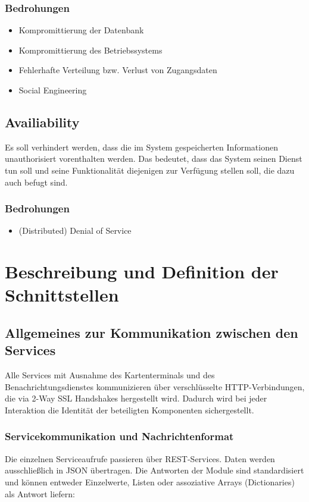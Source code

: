 \documentclass[12pt,a4paper,titlepage,oneside]{scrartcl}
\begin{document}
\subsubsection{Bedrohungen}
\begin{itemize}
	\item Kompromittierung der Datenbank
	\item Kompromittierung des Betriebssystems
	\item Fehlerhafte Verteilung bzw. Verlust von Zugangsdaten
	\item Social Engineering
\end{itemize}

\subsection{Availiability}
Es soll verhindert werden, dass die im System gespeicherten Informationen
unauthorisiert vorenthalten werden. Das bedeutet, dass das System seinen Dienst
tun soll und seine Funktionalität diejenigen zur Verfügung stellen soll, die dazu
auch befugt sind.

\subsubsection{Bedrohungen}
\begin{itemize}
	\item (Distributed) Denial of Service
\end{itemize}

\section{Beschreibung und Definition der Schnittstellen}

\subsection{Allgemeines zur Kommunikation zwischen den Services}
Alle Services mit Ausnahme des Kartenterminals und des Benachrichtungsdienstes
kommunizieren über verschlüsselte HTTP-Verbindungen, die via 2-Way SSL Handshakes
hergestellt wird. Dadurch wird bei jeder Interaktion die Identität der beteiligten
Komponenten sichergestellt.

\subsubsection{Servicekommunikation und Nachrichtenformat}
Die einzelnen Serviceaufrufe passieren über REST-Services. Daten werden
ausschließlich in JSON übertragen. Die Antworten der Module sind standardisiert
und können entweder Einzelwerte, Listen oder assoziative Arrays (Dictionaries)
als Antwort liefern:
\end{document}
